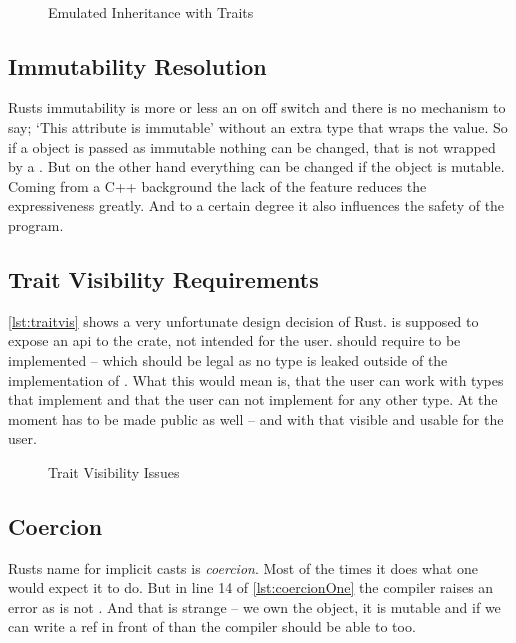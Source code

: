 \documentclass[thesis]{subfiles}
\begin{document}
    \begin{figure}[ht]
      \captionsetup{type=lstlisting}
      \usebox{\staticOne}\hfill%
      \usebox{\staticTwo}\\%
      \usebox{\staticThree}
      \caption{Emulated Inheritance with Traits}\label{lst:static}
    \end{figure}

  \subsection{Immutability Resolution}
    Rusts immutability is more or less an on off switch and there is no mechanism to say; `This attribute is immutable' without an extra type that wraps the value.
    So if a object is passed as immutable nothing can be changed, that is not wrapped by a \UnsafeCellT.
    But on the other hand everything can be changed if the object is mutable.
    Coming from a C++ background the lack of the  feature reduces the expressiveness greatly.
    And to a certain degree it also influences the safety of the program.

  \subsection{Trait Visibility Requirements}
    \autoref{lst:traitvis} shows a very unfortunate design decision of Rust.
     is supposed to expose an \gls{api} to the crate, not intended for the user.
     should require \A to be implemented -- which should be legal as no type is leaked outside of the implementation of \B.
    What this would mean is, that the user can work with types that implement \B and that the user can not implement \B for any other type.
    At the moment  has to be made public as well -- and with that visible and usable for the user.

    \begin{figure}[ht]
      \captionsetup{type=lstlisting}
      
      \caption{Trait Visibility Issues}\label{lst:traitvis}
    \end{figure}

  \subsection{Coercion}
    Rusts name for implicit casts is \emph{coercion}.
    Most of the times it does what one would expect it to do.
    But in line 14 of \autoref{lst:coercionOne} the compiler raises an error as \Foo is not .
    And that is strange -- we own the object, it is mutable and if we can write a ref in front of  than the compiler should be able to too.
\end{document}
